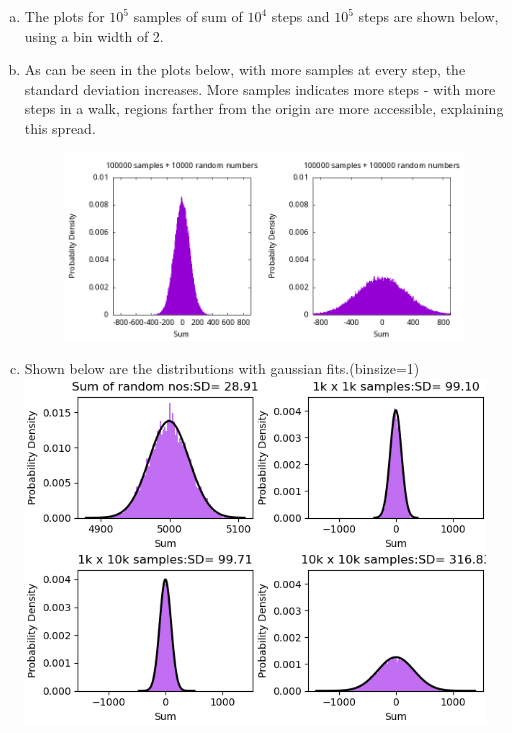 \documentclass[12 pt]{article}
\begin{document}
\begin{enumerate}[a.]
\item
The plots for $10^5$ samples of sum of $10^4$ steps and $10^5$ steps are shown below, using a bin width of 2.

\item
As can be seen in the plots below, with more samples at every step, the standard deviation increases. More samples indicates more steps - with more steps in a walk, regions farther from the origin are more accessible, explaining this spread.
\begin{figure}[htb!]
\centering\includegraphics[width=5.5in]{plots/random_walk_sum_10e5_bins.png}
\end{figure}

\item
Shown below are the distributions with gaussian fits.(binsize=1)
\vspace{4cm}
\centering\includegraphics[width=4.8in]{plots/plots_with_fit.png}

\end{enumerate}
\end{document}
